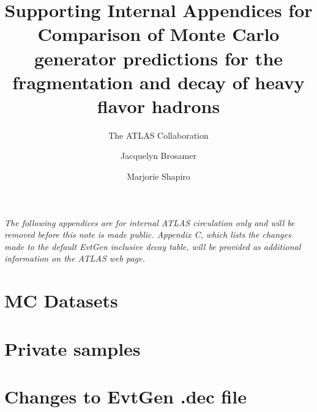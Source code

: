 \documentclass{atlasnote}
\title{Supporting Internal Appendices for Comparison of Monte Carlo generator predictions for the fragmentation and decay of heavy flavor hadrons}
\author{The ATLAS Collaboration}
\author[a]{Jacquelyn Brosamer}
\author[a]{Marjorie Shapiro}
\affil[a]{Lawrence Berkeley National Lab}
\begin{document}
% 
%
%
%
%
%
%
\appendix
\textit{The following appendices are for internal ATLAS circulation only and will be removed before this note is made public.  Appendix C, which lists the changes made to the default EvtGen inclusive decay table,
will be provided as additional information on the ATLAS web page.} 
\section{MC Datasets}
\label{app:datasets}

\section{Private samples}
\label{app:JO}

\clearpage
\section{Changes to EvtGen .dec file}
\label{app:DecFile}

\clearpage

%
\end{document}
